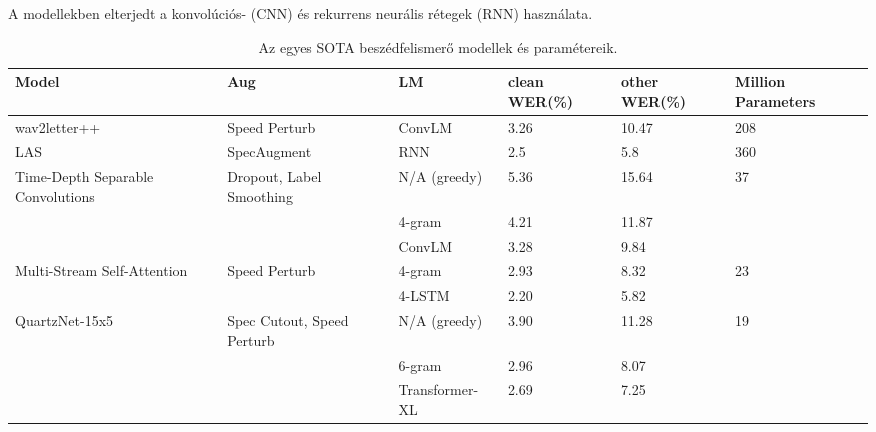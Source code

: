 A modellekben elterjedt a konvolúciós- (CNN) és rekurrens neurális rétegek  (RNN) használata.

\begin{table}[ht]
	\footnotesize
	\centering
	\begin{tabular}{ p{2.5cm} p{2.5cm} p{2.5cm} p{1.5cm} p{1.5cm} p{1cm} }
		\toprule
		\textbf{Model} & \textbf{Aug} & \textbf{LM} & \textbf{clean WER(\%)} & \textbf{other WER(\%)} & \textbf{Million Parameters} \\
		\midrule
		wav2letter++\cite{w2l} & Speed Perturb & ConvLM & 3.26 & 10.47 & 208 \\
		\hline
		LAS\cite{las} & SpecAugment & RNN & 2.5 & 5.8 & 360 \\
		\hline
		Time-Depth Separable Convolutions\cite{timedepth} & Dropout, Label Smoothing & N/A (greedy) & 5.36 & 15.64 & 37 \\
		&  & 4-gram & 4.21 & 11.87 &  \\
		&  & ConvLM & 3.28 & 9.84 &  \\
		\hline
		Multi-Stream Self-Attention\cite{attention} & Speed Perturb & 4-gram & 2.93 & 8.32 & 23  \\
		&  & 4-LSTM & 2.20 & 5.82 &  \\
		\hline
		QuartzNet-15x5\cite{quartznet} & Spec Cutout, Speed Perturb & N/A (greedy) & 3.90 & 11.28 & 19 \\
		&  & 6-gram & 2.96 & 8.07 &  \\
		&  & Transformer-XL & 2.69 & 7.25 &  \\
		\bottomrule
	\end{tabular}
	\caption{Az egyes SOTA beszédfelismerő modellek és paramétereik.}
\end{table}
